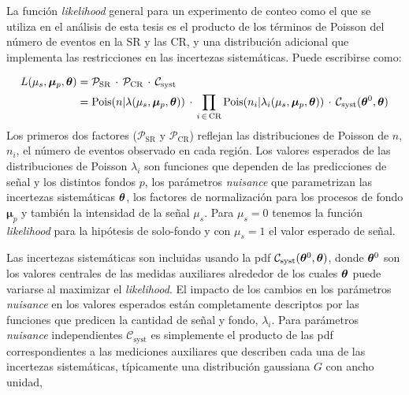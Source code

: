 

La función \emph{likelihood} general para un experimento de conteo como el que se utiliza
en el análisis de esta tesis es el producto de los términos de Poisson del
número de eventos en la SR y las CR, y una distribución adicional que implementa
las restricciones en las incertezas sistemáticas. Puede escribirse como:

\begin{align}
  L(\mu_s, \bm{\mu}_p, \bm{\theta}) &= \mathcal{P}_\text{SR} \, \cdot \, \mathcal{P}_\text{CR} \, \cdot \, \mathcal{C}_\text{syst} \nonumber \\
  &= \operatorname{Pois}(n|\lambda(\mu_s, \bm{\mu}_p, \bm{\theta})) \, \cdot \, \prod_{i \,\in\, \text{CR}} \operatorname{Pois}(n_i|\lambda_i(\mu_s, \bm{\mu}_p, \bm{\theta})) \, \cdot \, \mathcal{C}_\text{syst} (\bm{\theta}^0, \bm{\theta}) \label{eq:model}
\end{align}
%
Los primeros dos factores ($\mathcal{P}_\text{SR}$ y $\mathcal{P}_\text{CR}$)
reflejan las distribuciones de Poisson de $n$, $n_i$, el número de eventos observado
en cada región. Los valores esperados de las distribuciones de Poisson $\lambda_i$ son
funciones que dependen de las predicciones de señal y los distintos fondos $p$,
los parámetros \emph{nuisance} que parametrizan las incertezas sistemáticas $\bm{\theta}$,
los factores de normalización para los procesos de fondo $\bm{\mu}_p$ y también
la intensidad de la señal $\mu_s$. Para $\mu_s = 0$ tenemos la
función \emph{likelihood} para la hipótesis de solo-fondo y con $\mu_s = 1$ el
valor esperado de señal.

Las incertezas sistemáticas son incluidas usando la pdf
$\mathcal{C}_\text{syst}(\bm{\theta}^0, \bm{\theta})$, donde $\bm{\theta}^0$ son los valores centrales
de las medidas auxiliares alrededor de los cuales $\bm{\theta}$ puede variarse al
maximizar el \emph{likelihood}. El impacto de los cambios en los parámetros \emph{nuisance}
en los valores esperados están completamente descriptos por las funciones que
predicen la cantidad de señal y fondo, $\lambda_i$. Para parámetros \emph{nuisance}
independientes $\mathcal{C}_\text{syst}$ es simplemente el producto de las pdf
correspondientes a las mediciones auxiliares que describen cada una de las
incertezas sistemáticas, típicamente una distribución gaussiana $G$ con ancho
unidad,

